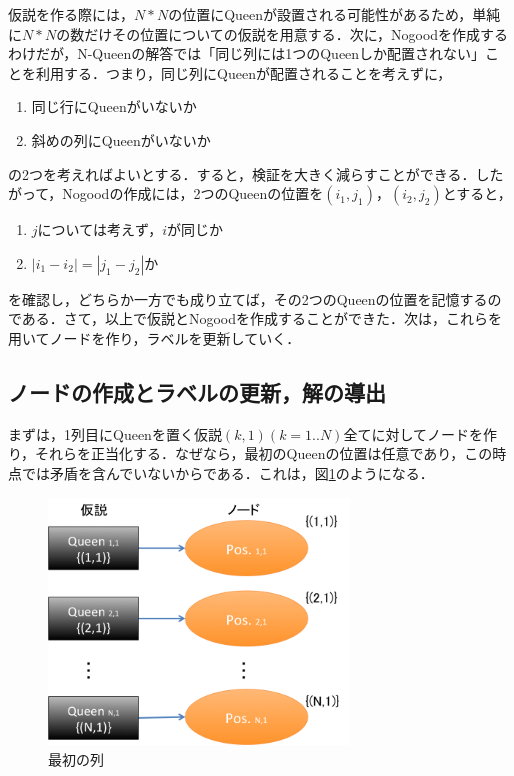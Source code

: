 \documentclass{jarticle}
\begin{document}
仮説を作る際には，$N*N$の位置にQueenが設置される可能性があるため，単純に$N*N$の数だけその位置についての仮説を用意する．次に，Nogoodを作成するわけだが，N-Queenの解答では「同じ列には1つのQueenしか配置されない」ことを利用する．つまり，同じ列にQueenが配置されることを考えずに，
\begin{enumerate}
	\item 同じ行にQueenがいないか
	\item 斜めの列にQueenがいないか
\end{enumerate}
の2つを考えればよいとする．すると，検証を大きく減らすことができる．したがって，Nogoodの作成には，2つのQueenの位置を$(i_1, j_1)，(i_2, j_2)$とすると，
\begin{enumerate}
	\item $j$については考えず，$i$が同じか
	\item $|i_1 - i_2| = |j_1 - j_2|$か
\end{enumerate}
を確認し，どちらか一方でも成り立てば，その2つのQueenの位置を記憶するのである．さて，以上で仮説とNogoodを作成することができた．次は，これらを用いてノードを作り，ラベルを更新していく．





\subsection{ノードの作成とラベルの更新，解の導出}
まずは，1列目にQueenを置く仮説$(k,1) (k = 1..N)$全てに対してノードを作り，それらを正当化する．なぜなら，最初のQueenの位置は任意であり，この時点では矛盾を含んでいないからである．これは，図\ref{fig:first-position}のようになる．

\begin{figure}[H]
	\begin{center}
	\includegraphics[width=80mm]{image/first-position.png}
	\caption{最初の列}
	\label{fig:first-position}
	\end{center}
\end{figure}
\end{document}
